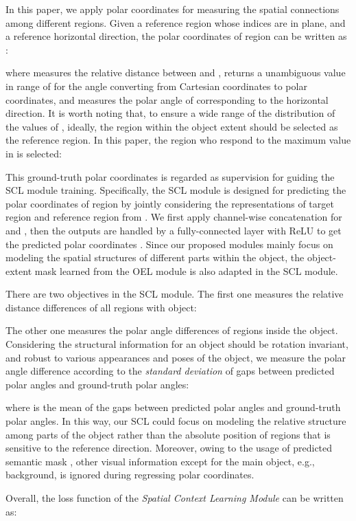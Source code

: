 \documentclass[10pt,twocolumn,letterpaper]{article}
\begin{document}
In this paper, we apply polar coordinates for measuring the spatial connections among different regions. Given a reference region  whose indices are  in  plane, and a reference horizontal direction, the polar coordinates of region  can be written as :

where  measures the relative distance between  and ,  returns a unambiguous value in range of  for the angle converting from Cartesian coordinates to polar coordinates, and  measures the polar angle of  corresponding to the horizontal direction. It is worth noting that, to ensure a wide range of the distribution of the values of , ideally, the region within the object extent should be selected as the reference region. In this paper, the region who respond to the maximum value in  is selected:


This ground-truth polar coordinates is regarded as supervision for guiding the SCL module training. Specifically, the SCL module is designed for predicting the polar coordinates of region  by jointly considering the representations of target region  and reference region  from . 
We first apply channel-wise concatenation for  and , then the outputs are handled by a fully-connected layer with ReLU to get the predicted polar coordinates . Since our proposed modules mainly focus on modeling the spatial structures of different parts within the object, the object-extent mask  learned from the OEL module is also adapted in the SCL module.

There are two objectives in the SCL module. The first one measures the relative distance differences of all regions with object:

The other one measures the polar angle differences of regions inside the object. Considering the structural information for an object should be rotation invariant, and robust to various appearances and poses of the object, we measure the polar angle difference  according to the \textit{standard deviation} of gaps between predicted polar angles and ground-truth polar angles:

where  is the mean of the gaps between predicted polar angles and ground-truth polar angles. In this way, our SCL could focus on modeling the relative structure among parts of the object rather than the absolute position of regions that is sensitive to the reference direction. Moreover, owing to the usage of predicted semantic mask , other visual information except for the main object, e.g., background, is ignored during regressing polar coordinates. 

Overall, the loss function of the \textit{Spatial Context Learning Module} can be written as:
\end{document}
